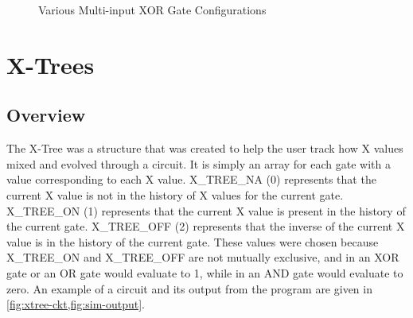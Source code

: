 \documentclass[12pt]{report}
\begin{document}
\begin{figure}[h!]
	\centering
	
	\label{fig:xor-group}
	\caption[Multi-input XOR Gates]{Various Multi-input XOR Gate Configurations}
\end{figure}

\singlespacing
\chapter{X-Trees}\label{sec:xtree}
\doublespacing

\section{Overview}

The X-Tree was a structure that was created to help the user track how X values mixed and evolved through a circuit. It is simply an array for each gate with a value corresponding to each X value. X\_TREE\_NA (0) represents that the current X value is not in the history of X values for the current gate. X\_TREE\_ON (1) represents that the current X value is present in the history of the current gate. X\_TREE\_OFF (2) represents that the inverse of the current X value is in the history of the current gate. These values were chosen because X\_TREE\_ON and X\_TREE\_OFF are not mutually exclusive, and in an XOR gate or an OR gate would evaluate to 1, while in an AND gate would evaluate to zero. An example of a circuit and its output from the program are given in \cref{fig:xtree-ckt,fig:sim-output}.
\end{document}
